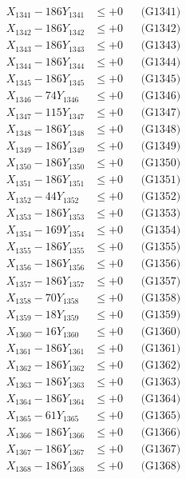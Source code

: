 \documentclass[a4paper,10pt]{article}
\begin{document}
{\begin{align}
\allowbreak
X_{1341} - 186Y_{1341} &\leq +0 && \text{(G1341)} \\
X_{1342} - 186Y_{1342} &\leq +0 && \text{(G1342)} \\
X_{1343} - 186Y_{1343} &\leq +0 && \text{(G1343)} \\
X_{1344} - 186Y_{1344} &\leq +0 && \text{(G1344)} \\
X_{1345} - 186Y_{1345} &\leq +0 && \text{(G1345)} \\
X_{1346} - 74Y_{1346} &\leq +0 && \text{(G1346)} \\
X_{1347} - 115Y_{1347} &\leq +0 && \text{(G1347)} \\
X_{1348} - 186Y_{1348} &\leq +0 && \text{(G1348)} \\
X_{1349} - 186Y_{1349} &\leq +0 && \text{(G1349)} \\
X_{1350} - 186Y_{1350} &\leq +0 && \text{(G1350)} \\
\allowbreak
X_{1351} - 186Y_{1351} &\leq +0 && \text{(G1351)} \\
X_{1352} - 44Y_{1352} &\leq +0 && \text{(G1352)} \\
X_{1353} - 186Y_{1353} &\leq +0 && \text{(G1353)} \\
X_{1354} - 169Y_{1354} &\leq +0 && \text{(G1354)} \\
X_{1355} - 186Y_{1355} &\leq +0 && \text{(G1355)} \\
X_{1356} - 186Y_{1356} &\leq +0 && \text{(G1356)} \\
X_{1357} - 186Y_{1357} &\leq +0 && \text{(G1357)} \\
X_{1358} - 70Y_{1358} &\leq +0 && \text{(G1358)} \\
X_{1359} - 18Y_{1359} &\leq +0 && \text{(G1359)} \\
X_{1360} - 16Y_{1360} &\leq +0 && \text{(G1360)} \\
\allowbreak
X_{1361} - 186Y_{1361} &\leq +0 && \text{(G1361)} \\
X_{1362} - 186Y_{1362} &\leq +0 && \text{(G1362)} \\
X_{1363} - 186Y_{1363} &\leq +0 && \text{(G1363)} \\
X_{1364} - 186Y_{1364} &\leq +0 && \text{(G1364)} \\
X_{1365} - 61Y_{1365} &\leq +0 && \text{(G1365)} \\
X_{1366} - 186Y_{1366} &\leq +0 && \text{(G1366)} \\
X_{1367} - 186Y_{1367} &\leq +0 && \text{(G1367)} \\
X_{1368} - 186Y_{1368} &\leq +0 && \text{(G1368)} \\

\end{align}}
\end{document}
